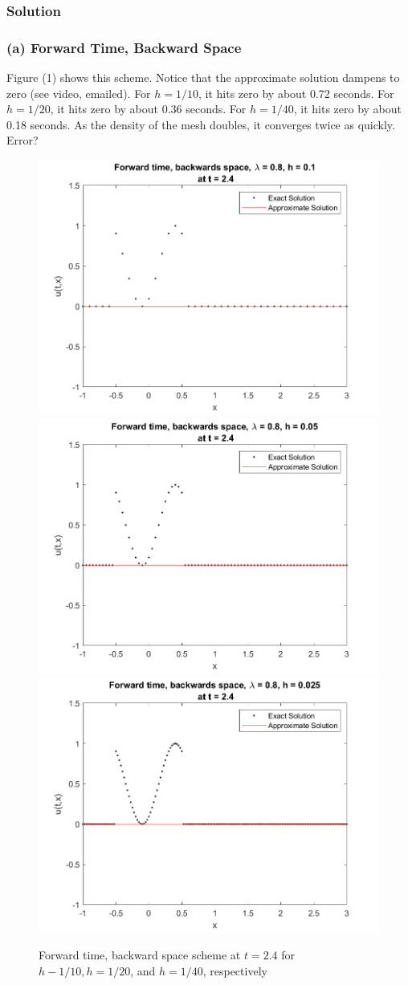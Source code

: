 \documentclass[12pt]{article}
\begin{document}
\subsubsection*{Solution}

\subsubsection*{(a) Forward Time, Backward Space}

Figure (1) shows this scheme. Notice that the approximate solution dampens to zero (see video, emailed). For $h=1/10$, it hits zero by about 0.72 seconds. For $h=1/20$, it hits zero by about 0.36 seconds. For $h=1/40$, it hits zero by about 0.18 seconds. As the density of the mesh doubles, it converges twice as quickly. Error?

\begin{figure}
	\centering
	\includegraphics[width=.6\linewidth]{./code/a_forward_time_backward_space_h_one_10th.png}	\includegraphics[width=.6\linewidth]{./code/a_forward_time_backward_space_h_one_20th.png}
	\includegraphics[width=.6\linewidth]{./code/a_forward_time_backward_space_h_one_40th.png}
	\caption{Forward time, backward space scheme at $t=2.4$ for $h-1/10, h=1/20$, and $h=1/40$, respectively}
\end{figure}
\end{document}
